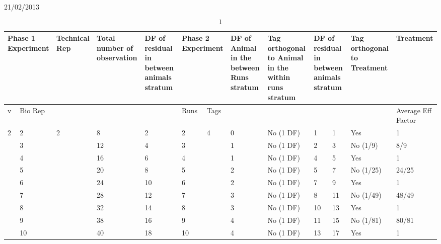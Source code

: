 
     21/02/2013

\noindent 
\[1\] 


\begin{tabular}{|p{0.5in}|p{0.4in}|p{0.5in}|p{0.7in}|p{0.7in}|p{0.3in}|p{0.3in}|p{0.7in}|p{0.7in}|p{0.2in}|p{0.4in}|p{0.6in}|p{0.6in}|} \hline 
\multicolumn{2}{|p{1in}|}{Phase 1 Experiment} & Technical Rep & Total number of observation  & DF of residual in between animals stratum & \multicolumn{2}{|p{0.7in}|}{Phase 2 Experiment} & DF of Animal in the between Runs stratum  & Tag orthogonal to Animal in the within runs stratum & \multicolumn{2}{|p{0.6in}|}{DF of residual in between animals stratum} & Tag orthogonal to Treatment & Treatment \\ \hline 
v & Bio Rep &  &  &  & Runs & Tags  &  &  & \multicolumn{2}{|p{0.6in}|}{} &  & Average Eff Factor \\ \hline 
2 & 2 & 2 & 8 & 2 & 2 & 4 & 0 & No (1 DF) & 1 & 1 & Yes & 1 \\ \hline 
 & 3 &  & 12 & 4 & 3 &  & 1 & No (1 DF) & 2 & 3 & No (1/9) & 8/9 \\ \hline 
 & 4 &  & 16 & 6 & 4 &  & 1 & No (1 DF) & 4 & 5 & Yes & 1 \\ \hline 
 & 5 &  & 20 & 8 & 5 &  & 2 & No (1 DF) & 5 & 7 & No (1/25) & 24/25 \\ \hline 
 & 6 &  & 24 & 10 & 6 &  & 2 & No (1 DF) & 7 & 9 & Yes & 1 \\ \hline 
 & 7 &  & 28 & 12 & 7 &  & 3 & No (1 DF) & 8 & 11 & No (1/49) & 48/49 \\ \hline 
 & 8 &  & 32 & 14 & 8 &  & 3 & No (1 DF) & 10 & 13 & Yes & 1 \\ \hline 
 & 9 &  & 38 & 16 & 9 &  & 4 & No (1 DF) & 11 & 15 & No (1/81) & 80/81 \\ \hline 
 & 10 &  & 40 & 18 & 10 &  & 4 & No (1 DF) & 13 & 17 & Yes & 1 \\ \hline 
\end{tabular}



\noindent 

